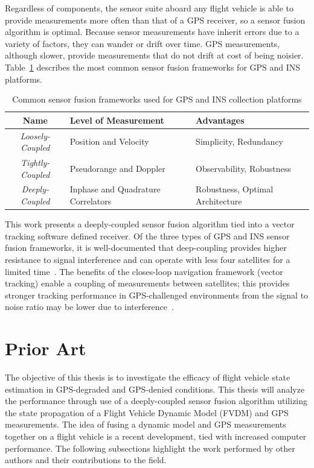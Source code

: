 Regardless of components, the sensor suite aboard any flight vehicle is able to provide measurements more often than that of a GPS receiver, so a sensor fusion algorithm is optimal. Because sensor measurements have inherit errors due to a variety of factors, they can wander or drift over time. GPS measurements, although slower, provide measurements that do not drift at cost of being noisier. Table~\ref{tbl:sensorfusionframeworks} describes the most common sensor fusion frameworks for GPS and INS platforms.
\begin{table}[!ht]\label{tbl:sensorfusionframeworks}
    \caption{Common sensor fusion frameworks used for GPS and INS collection platforms}
    \centering
    \begin{tabular}{cll}
        \toprule
        \textbf{Name}            & \textbf{Level of Measurement}      & \textbf{Advantages}              \\
        \midrule
        \textit{Loosely-Coupled} & Position and Velocity              & Simplicity, Redundancy           \\
        \textit{Tightly-Coupled} & Pseudorange and Doppler            & Observability, Robustness        \\
        \textit{Deeply-Coupled}  & Inphase and Quadrature Correlators & Robustness, Optimal Architecture \\
        \bottomrule
    \end{tabular}
\end{table}
This work presents a deeply-coupled sensor fusion algorithm tied into a vector tracking software defined receiver. Of the three types of GPS and INS sensor fusion frameworks, it is well-documented that deep-coupling provides higher resistance to signal interference and can operate with less four satellites for a limited time~\cite{wattsGPSGLONASSL12019}. The benefits of the closes-loop navigation framework (vector tracking) enable a coupling of measurements between satellites; this provides stronger tracking performance in GPS-challenged environments from the signal to noise ratio may be lower due to interference~\cite{grierElyaJoffeAndreas}.
\section{Prior Art}
The objective of this thesis is to investigate the efficacy of flight vehicle state estimation in GPS-degraded and GPS-denied conditions. This thesis will analyze the performance through use of a deeply-coupled sensor fusion algorithm utilizing the state propagation of a Flight Vehicle Dynamic Model (FVDM) and GPS measurements. The idea of fusing a dynamic model and GPS measurements together on a flight vehicle is a recent development, tied with increased computer performance. The following subsections highlight the work performed by other authors and their contributions to the field.
